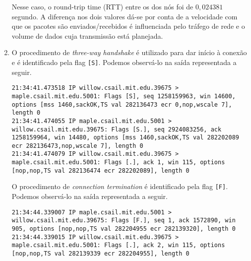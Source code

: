 \documentclass[a4paper,10pt]{article}
\begin{document}
\begin{enumerate}
Nesse caso, o round-trip time (RTT) entre os dos nós foi de $0,024381$ segundo. A diferença nos dois valores dá-se por conta de a velocidade com que os pacotes são enviados/recebidos é influenciada pelo tráfego de rede e o volume de dados cuja transmissão está planejada.


\item O procedimento de \textit{three-way handshake} é utilizado para dar início à conexão e é identificado pela flag {\tt [S]}. Podemos observá-lo na saída representada a seguir.

\begin{lstlisting}
21:34:41.473518 IP willow.csail.mit.edu.39675 > maple.csail.mit.edu.5001: Flags [S], seq 1258159963, win 14600, options [mss 1460,sackOK,TS val 282136473 ecr 0,nop,wscale 7], length 0
21:34:41.474055 IP maple.csail.mit.edu.5001 > willow.csail.mit.edu.39675: Flags [S.], seq 2924083256, ack 1258159964, win 14480, options [mss 1460,sackOK,TS val 282202089 ecr 282136473,nop,wscale 7], length 0
21:34:41.474079 IP willow.csail.mit.edu.39675 > maple.csail.mit.edu.5001: Flags [.], ack 1, win 115, options [nop,nop,TS val 282136474 ecr 282202089], length 0
\end{lstlisting}	

O procedimento de \textit{connection termination} é identificado pela flag {\tt [F]}. Podemos observá-lo na saída representada a seguir.

\begin{lstlisting}
21:34:44.339007 IP maple.csail.mit.edu.5001 > willow.csail.mit.edu.39675: Flags [F.], seq 1, ack 1572890, win 905, options [nop,nop,TS val 282204955 ecr 282139320], length 0
21:34:44.339015 IP willow.csail.mit.edu.39675 > maple.csail.mit.edu.5001: Flags [.], ack 2, win 115, options [nop,nop,TS val 282139339 ecr 282204955], length 0
\end{lstlisting}

\end{enumerate}
\end{document}

